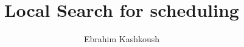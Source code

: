 \documentclass[11pt,fullpage]{article}
\begin{document}
 \newtheorem{theorem}{Theorem}[section]
 \newtheorem{corollary}{Corollary}[section]
 \newtheorem{lemma}{Lemma}[section]
 \newtheorem{exercise}{Exercise}
 \newtheorem{claim}{Claim}[section]
 \newtheorem{definition}{Definition}[section]
\def \n { \{1..n \} }
\def\proof{\noindent{\bf Proof:~}}
\def\Proof{\noindent{\bf Proof:~}}
\def\blackslug{\hbox{\hskip 1pt \vrule width 4pt height 8pt
    depth 1.5pt \hskip 1pt}}
\def\QED{\quad\blackslug\lower 8.5pt\null\par}
\def\mul {\times}
\def \lr {\longrightarrow}
\def \sr {\longrightarrow}
\def \Lr {\longleftarrow}
\def \dr {{\downarrow}}
\def \bs {\backslash }
\newcommand \nxt[1]{
             \stackrel{#1}{\lr}
}
 
\newcommand \sss[1]{
            \begin{array}[t]{l}
             #1\stackrel{\mbox{\tiny no}}{\lr}\\
             \dr
            \end{array}
}
\newcommand {\spp}[1] {
           \begin{picture}(30,30)
           \put(10,20){\sequence(1,0){20}}
           \put(10,20){\sequence(0,-1){20}}
           \put(16,22){n}
           \put(6,10){y}
           \put(0,22){#1}
           \end{picture}
         }
 

\newcommand{\utrans}[3]{
\begin{center}\tt
\renewcommand{\arraystretch}{1.4}
\begin{tabular}{|p{#3 mm}|}
\hline
\vspace*{-3ex}~\parbox{0pt}{\begin{tabbing} #1 \end{tabbing}} \\ \hline
#2 \\
\hline
\end{tabular}
\end{center}
}

%
\title{Local Search for scheduling}
\author{Ebrahim Kashkoush\\
      }

\date{}
\end{document}
